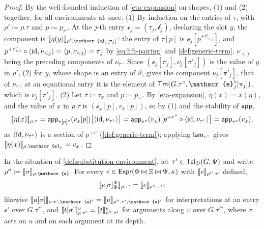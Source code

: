 \begin{proof}
    By the well-founded induction of \cref{eta-expansion} on shapes, (1) and (2) together, for all environments at once. (1) By induction on the entries of $\tau$, with $\rho' \coloneqq \rho.\tau$ and $p \coloneqq p_{\tau^{\circ}}$. At the $j$-th entry $\mathscr{e}_j = (\tau_j, \mathscr{b}_j)$, declaring the slot $y$, the component is $\sem{\eta(y)}_{\rho', \mathscr{e}_j[\pi_j]}$: the entry of $\tau[p]$ is $\mathscr{e}_j[p^{+\tau^{\circ}_{<j}}]$, and $p^{+\tau^{\circ}_{<j}} \circ \langle \mathrm{id}, \nu_{<j} \rangle = \langle p, \nu_{<j} \rangle = \pi_j$ by \eqref{eq:lift-pairing} and \cref{def:generic-term}, $\nu_{<j}$ being the preceding components of $\nu_{\tau^{\circ}}$. Since $(\mathscr{e}_j[\pi_j], \nu_j[\pi'_j])$ is the value of $y$ in $\rho'$, (2) for $y$, whose shape is an entry of $\vartheta$, gives the component $\nu_j[\pi'_j]$, that of $\nu_{\tau^{\circ}}$; at an equational entry it is the element of $\Tm(G.\tau^{\circ}, \mathscr{e}_j^{\circ}[\pi_j])$, which is $\nu_j[\pi'_j]$. (2) Let $\tau \coloneqq \tau_x$ and $p \coloneqq p_{\tau^{\circ}}$. By \cref{eta-expansion}, $\eta(x) = x(\eta)$, and the value of $x$ in $\rho.\tau$ is $(\mathscr{e}_x[p], v_x[p])$, so by (1) and the stability of $\mathsf{app}$,
    \[
        \llbracket\eta(x)\rrbracket_{\rho.\tau} = \mathsf{app}_{\tau[p]^{\circ}}(v_x[p])\big[\langle \mathrm{id}, \nu_{\tau^{\circ}} \rangle\big] = \mathsf{app}_{\tau^{\circ}}(v_x)\big[p^{+\tau^{\circ}} \circ \langle \mathrm{id}, \nu_{\tau^{\circ}} \rangle\big] = \mathsf{app}_{\tau^{\circ}}(v_x),
    \]
    as $\langle \mathrm{id}, \nu_{\tau^{\circ}} \rangle$ is a section of $p^{+\tau^{\circ}}$ (\cref{def:generic-term}); applying $\mathsf{lam}_{\tau^{\circ}}$ gives $\sem{\eta(x)}_{\rho, \mathscr{e}_x} = v_x$.
\end{proof}

\begin{lemma}[Substitution]\label{lem:interpretation-substitution}
    In the situation of \cref{def:substitution-environment}, let $\tau' \in \mathsf{Tel}_{\mathcal{D}}(G, \Psi)$ and write $\rho'' \coloneqq \sem{\sigma}_{\rho, \mathscr{e}}$. For every $e \in \mathsf{Expr}(\Phi \mathbin{\bowtie} \Xi \mathbin{\bowtie} \Psi, \kappa)$ with $\llbracket e\rrbracket_{\rho''.\tau'}$ defined,
    \[
        \llbracket e[\sigma]_\Phi^\Psi\rrbracket_{\rho.\tau'} = \llbracket e\rrbracket_{\rho''.\tau'};
    \]
    likewise $\sem{u[\sigma]}_{\rho.\tau', \mathscr{e}'} = \sem{u}_{\rho''.\tau', \mathscr{e}'}$ for interpretations at an entry $\mathscr{e}'$ over $G.\tau'^{\circ}$, and $\llbracket t[\sigma]\rrbracket^{\upsilon}_{\rho.\tau'} = \llbracket t\rrbracket^{\upsilon}_{\rho''.\tau'}$ for arguments along $\upsilon$ over $G.\tau'^{\circ}$, where $\sigma$ acts on $u$ and on each argument at its depth.
\end{lemma}

